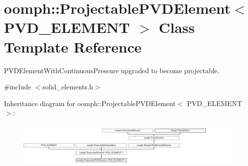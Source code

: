 \hypertarget{classoomph_1_1ProjectablePVDElement}{}\section{oomph\+:\+:Projectable\+P\+V\+D\+Element$<$ P\+V\+D\+\_\+\+E\+L\+E\+M\+E\+NT $>$ Class Template Reference}
\label{classoomph_1_1ProjectablePVDElement}


P\+V\+D\+Element\+With\+Continuous\+Pressure upgraded to become projectable.  




{\ttfamily \#include $<$solid\+\_\+elements.\+h$>$}

Inheritance diagram for oomph\+:\+:Projectable\+P\+V\+D\+Element$<$ P\+V\+D\+\_\+\+E\+L\+E\+M\+E\+NT $>$\+:\begin{figure}[H]
\begin{center}
\leavevmode
\includegraphics[height=2.243590cm]{classoomph_1_1ProjectablePVDElement}
\end{center}
\end{figure}

